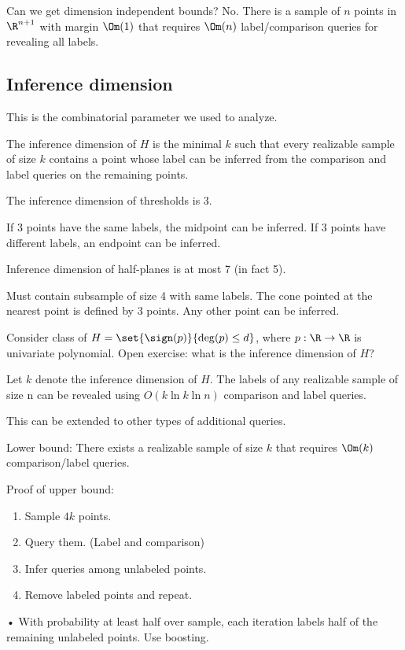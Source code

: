 
Can we get dimension independent bounds? No. There is a sample of $n$ points in $\R^{n+1}$ with margin $\Om(1)$ that requires $\Om(n)$ label/comparison queries for revealing all labels.

\subsection{Inference dimension}

This is the combinatorial parameter we used to analyze.
\begin{df}
The inference dimension of $H$ is the minimal $k$ such that every realizable sample of size $k$ contains a point whose label can be inferred from the comparison and label queries on the remaining points.
\end{df}
\begin{clm}
The inference dimension of thresholds is 3.
\end{clm}
If 3 points have the same labels, the midpoint can be inferred. If 3 points have different labels, an endpoint can be inferred.

Inference dimension of half-planes is at most 7 (in fact 5). 

Must contain subsample of size 4 with same labels. The cone pointed at the nearest point is defined by 3 points. Any other point can be inferred.

Consider class of $H=\set{\sign(p)}{\deg(p)\le d}$, where $p:\R\to \R$ is univariate polynomial. Open exercise: what is the inference dimension of $H$?

%
\begin{thm}
Let $k$ denote the inference dimension of $H$.
The labels of any realizable sample of size n can be  revealed using $O(k\ln k\ln n)$ comparison and label queries. 
\end{thm}
This can be extended to other types of additional queries.

Lower bound: There exists a realizable sample of size $k$ that requires $\Om(k)$ comparison/label queries.

Proof of upper bound: 
\begin{enumerate}
\item
Sample $4k$ points.
\item
Query them. (Label and comparison)
\item
Infer queries among unlabeled points.
\item
Remove labeled points and repeat.
\end{enumerate}•
With probability at least half over sample, each iteration labels half of the remaining unlabeled points. Use boosting.

